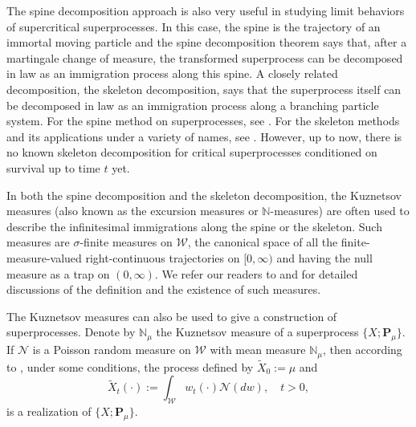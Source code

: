 	The spine decomposition approach is also very useful in studying limit behaviors of supercritical superprocesses.
	In this case, the spine is the trajectory of an immortal moving particle and the spine decomposition theorem says that, after a martingale change of measure, the transformed superprocess can be decomposed in law as an immigration process along this spine.
	A closely related decomposition, the skeleton decomposition, says that the superprocess itself can be decomposed in law as an immigration process along a branching particle system.
	For the spine method on superprocesses, see \cite{EckhoffKyprianouWinkel2015Spines, EnglanderKyprianou2004Local,  LiuRenSong2009Llog}.
	For the skeleton methods and its applications under a variety of names, see \cite{BerestyckiKyprianouMurillo-Salas2011The-prolific,  BertoinFontbonaMartinez2008On-prolific, DuquesneWinkel2007Growth, EckhoffKyprianouWinkel2015Spines, EnglanderPinsky1999On-the-construction, EvansOConnell1994Weighted,  KyprianouPerezRen2014The-backbone, KyprianouRen2012Backbone,  Milos2012Spatial, RenSongZhang2015Central}.
	However, up to now, there is no known skeleton decomposition for critical superprocesses conditioned on survival up to time $t$ yet.
\par
	In both the spine decomposition and the skeleton decomposition, the Kuznetsov measures (also known as the excursion measures or $\mathbb N$-measures) are often used to describe the infinitesimal immigrations along the spine or the skeleton.
	Such measures are $\sigma$-finite measures
on $\mathcal W$,
	the canonical space of all the finite-measure-valued right-continuous trajectories
	on $[0, \infty)$ and having the null measure as a trap on $(0, \infty)$.
	We refer our readers to \cite{DynkinKuznetsov2004mathbb} and \cite[Section 8.4]{Li2011Measure-valued} for detailed discussions of the definition and the existence of such measures.
\par
	The Kuznetsov measures can also be used to give
	a construction of superprocesses.
	Denote by $\mathbb N_\mu$ the Kuznetsov measure of a superprocess $\{X;\mathbf P_\mu\}$.
	If $\mathcal N$ is a Poisson random measure on $\mathcal W$ with mean measure $\mathbb N_\mu$, then according to \cite[Theorem 8.24]{Li2011Measure-valued}, under some conditions, the process defined by $\widetilde X_0:=\mu$ and
\begin{equation}\label{eq:Mot-5}
	\widetilde X_t(\cdot)
	:= \int_{\mathcal W} w_t(\cdot)\mathcal N(dw),
	\quad t>0,
\end{equation}
	is a realization of $\{X;\mathbf P_{\mu}\}$.
